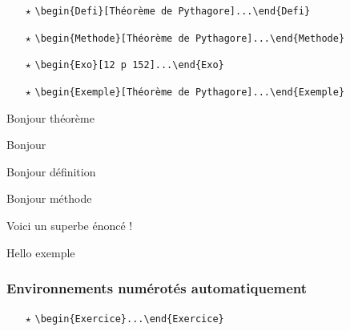 \documentclass[12pt,french]{article}
\begin{document}
\begin{spacing}{1.2}
\begin{itemize}
\item[$\star$] \verb=\begin{Defi}[Théorème de Pythagore]...\end{Defi}=\,

\item[$\star$] \verb=\begin{Methode}[Théorème de Pythagore]...\end{Methode}=\,

\item[$\star$] \verb=\begin{Exo}[12 p 152]...\end{Exo}=\,

\item[$\star$] \verb=\begin{Exemple}[Théorème de Pythagore]...\end{Exemple}=\,

\end{itemize}

\begin{Thm}
Bonjour théorème
\end{Thm}

\begin{Prop}
Bonjour
\end{Prop}


\begin{Defi}
Bonjour définition
\end{Defi}


\begin{Methode}
Bonjour méthode
\end{Methode}

\begin{Exo}[12 p 152]
Voici un superbe énoncé !
\end{Exo}

\begin{Exemple}
Hello exemple
\end{Exemple}


\subsubsection{Environnements numérotés automatiquement}

\begin{itemize}

\item[$\star$] \verb=\begin{Exercice}...\end{Exercice}=\,


\end{itemize}
\end{spacing}
\end{document}
